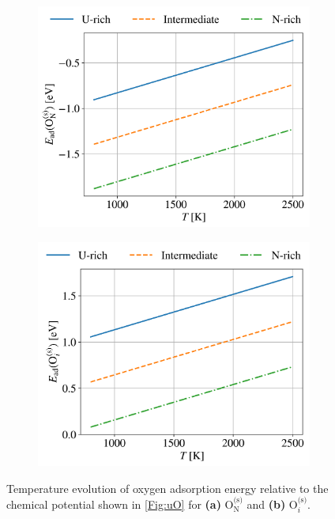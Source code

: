 \documentclass[preprint,12pt,sort&compress]{elsarticle}
\newcommand{\?}{\stackrel{?}{=}}
\begin{document}
\begin{figure}[h!]
\centering
\begin{subfigure}{0.48\textwidth}
    \includegraphics[width=\textwidth]{EadONs.png}
    \caption{}
    \label{Fig:EadONs}
\end{subfigure}
\hfill
\begin{subfigure}{0.48\textwidth}
    \includegraphics[width=\textwidth]{EadOis.png}
    \caption{}
    \label{Fig:EadOis}
\end{subfigure}
\caption{Temperature evolution of oxygen adsorption energy relative to the chemical potential shown in \cref{Fig:uO} for \textbf{(a)} $\text{O}_\text{N}^\text{(s)}$ and \textbf{(b)} $\text{O}_i^\text{(s)}$.}
\label{Fig:EduO}
\end{figure}
\end{document}
